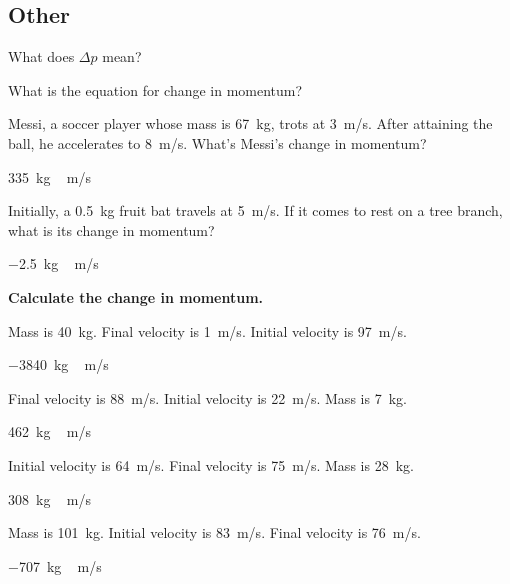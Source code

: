 \documentclass[../main-physics-problems.tex]{subfiles}
\begin{document}
\begin{questions}
\end{questions}

\clearpage
\subsection*{Other}

\begin{questions}
\question
What does $\Delta p$ mean?


\question
What is the equation for change in momentum? 


\question \label{Isttuf}
Messi, a soccer player whose mass is \SI{67}{kg}, trots at \SI{3}{m/s}. After attaining the ball, he accelerates to \SI{8}{m/s}. What's Messi's change in momentum? 

\begin{solution}
\SI{335}{kg\,m/s}
\end{solution}


\question \label{1vMk6B}
Initially, a \SI{0.5}{kg} fruit bat travels at \SI{5}{m/s}. If it comes to rest on a tree branch, what is its change in momentum?

\begin{solution}
\SI{-2.5}{kg\,m/s}
\end{solution}

\textbf{Calculate the change in momentum.}

\question \label{VtoBkS}
Mass is \SI{40}{kg}. Final velocity is \SI{1}{m/s}. Initial velocity is \SI{97}{m/s}.

\begin{solution}
\SI{-3840}{kg\,m/s}
\end{solution}

\question \label{fhENr6}
Final velocity is \SI{88}{m/s}. Initial velocity is \SI{22}{m/s}. Mass is \SI{7}{kg}.

\begin{solution}
\SI{462}{kg\,m/s}
\end{solution}


\question \label{MqRZuz}
Initial velocity is \SI{64}{m/s}. Final velocity is \SI{75}{m/s}. Mass is \SI{28}{kg}.

\begin{solution}
\SI{308}{kg\,m/s}
\end{solution}


\question \label{qSPMmV}
Mass is \SI{101}{kg}. Initial velocity is \SI{83}{m/s}. Final velocity is \SI{76}{m/s}. 

\begin{solution}
\SI{-707}{kg\,m/s}
\end{solution}



\end{questions}
\end{document}
